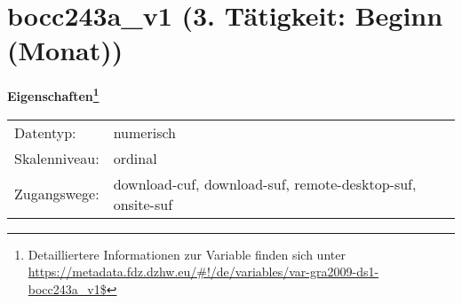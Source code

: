 
    \setcounter{footnote}{0}

    \vspace*{-1.8cm}
	\section{bocc243a\_v1 (3. Tätigkeit: Beginn (Monat))}
	\label{section:bocc243a_v1}



    \vspace*{0.5cm}
    \noindent\textbf{Eigenschaften\footnote{Detailliertere Informationen zur Variable finden sich unter
		\url{https://metadata.fdz.dzhw.eu/\#!/de/variables/var-gra2009-ds1-bocc243a_v1$}}}\\
	\begin{tabularx}{\hsize}{@{}lX}
	Datentyp: & numerisch \\
	Skalenniveau: & ordinal \\
	Zugangswege: &
	  download-cuf, 
	  download-suf, 
	  remote-desktop-suf, 
	  onsite-suf
 \\
    \end{tabularx}



